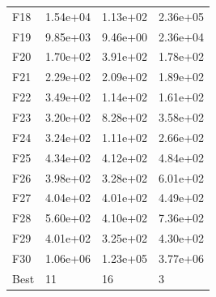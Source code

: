 \begin{table}[H]
\begin{minipage}{.5\linewidth}
\begin{tabular}{llll}
        F18  &  1.54e+04 &  1.13e+02 &  2.36e+05 \\
        F19  &  9.85e+03 &  9.46e+00 &  2.36e+04 \\
        F20  &  1.70e+02 &  3.91e+02 &  1.78e+02 \\
        F21  &  2.29e+02 &  2.09e+02 &  1.89e+02 \\
        F22  &  3.49e+02 &  1.14e+02 &  1.61e+02 \\
        F23  &  3.20e+02 &  8.28e+02 &  3.58e+02 \\
        F24  &  3.24e+02 &  1.11e+02 &  2.66e+02 \\
        F25  &  4.34e+02 &  4.12e+02 &  4.84e+02 \\
        F26  &  3.98e+02 &  3.28e+02 &  6.01e+02 \\
        F27  &  4.04e+02 &  4.01e+02 &  4.49e+02 \\
        F28  &  5.60e+02 &  4.10e+02 &  7.36e+02 \\
        F29  &  4.01e+02 &  3.25e+02 &  4.30e+02 \\
        F30  &  1.06e+06 &  1.23e+05 &  3.77e+06 \\
        Best &        11 &        16 &         3 \\
        \bottomrule
        \end{tabular}
        

\end{minipage}
\end{table}
